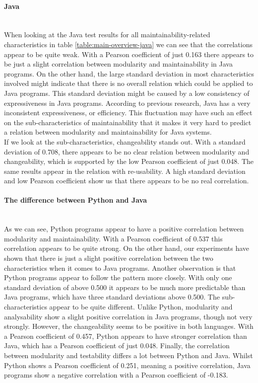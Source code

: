 \documentclass[twoside]{uva-inf-bachelor-thesis}
\newcommand{\myparagraph}[1]{\paragraph{#1}\mbox{}\\}
\begin{document}
\myparagraph{Java}
When looking at the Java test results for all maintainability-related characteristics in table \ref{table:main-overview-java} we can see that the correlations appear to be quite weak. With a Pearson coefficient of just 0.163 there appears to be just a slight correlation between modularity and maintainability in Java programs. On the other hand, the large standard deviation in most characteristics involved might indicate that there is no overall relation which could be applied to Java programs. This standard deviation might be caused by a low consistency of expressiveness in Java programs. According to previous research\cite{Expressiveness}, Java has a very inconsistent expressiveness, or efficiency. This fluctuation may have such an effect on the sub-characteristics of maintainability that it makes it very hard to predict a relation between modularity and maintainability for Java systems.\\

If we look at the sub-characteristics, changeability stands out. With a standard deviation of 0.708, there appears to be no clear relation between modularity and changeability, which is supported by the low Pearson coefficient of just 0.048. The same results appear in the relation with re-usability. A high standard deviation and low Pearson coefficient show us that there appears to be no real correlation.

\myparagraph{The difference between Python and Java}
As we can see, Python programs appear to have a positive correlation between modularity and maintainability. With a Pearson coefficient of 0.537 this correlation appears to be quite strong. On the other hand, our experiments have shown that there is just a slight positive correlation between the two characteristics when it comes to Java programs. Another observation is that Python programs appear to follow the pattern more closely. With only one standard deviation of above 0.500 it appears to be much more predictable than Java programs, which have three standard deviations above 0.500. The sub-characteristics appear to be quite different. Unlike Python, modularity and analysability show a slight positive correlation in Java programs, though not very strongly. However, the changeability seems to be positive in both languages. With a Pearson coefficient of 0.457, Python appears to have stronger correlation than Java, which has a Pearson coefficient of just 0.048. Finally, the correlation between modularity and testability differs a lot between Python and Java. Whilst Python shows a Pearson coefficient of 0.251, meaning a positive correlation, Java programs show a negative correlation with a Pearson coefficient of -0.183.\\
\end{document}
